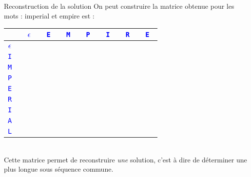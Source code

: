 \documentclass[10pt]{beamer}
\begin{document}
\begin{frame}{\Ctitle}{\stitle}
	\begin{exampleblock}{Reconstruction de la solution}
		{\small On peut construire la matrice obtenue pour les mots  : {\sc imperial} et {\sc empire} est : \\}
		\renewcommand{\arraystretch}{1.2}
		\quad \quad \begin{tabular}{|>{\tt}c|>{\tt}c|>{\tt}c|>{\tt}c|>{\tt}c|>{\tt}c|>{\tt}c|>{\tt}c|}

			\cline{2-8}
			\multicolumn{1}{c|}{}        & \textcolor{blue}{$\epsilon$} & \textcolor{blue}{E} & \textcolor{blue}{M} & \textcolor{blue}{P} & \textcolor{blue}{I} & \textcolor{blue}{R} & \textcolor{blue}{E} \\
			\hline
			\textcolor{blue}{$\epsilon$} &                              &                     &                     &                     &                     &                     &                     \\
			\textcolor{blue}{I}          &                              &                     &                     &                     &                     &                     &                     \\
			\textcolor{blue}{M}          &                              &                     &                     &                     &                     &                     &                     \\
			\textcolor{blue}{P}          &                              &                     &                     &                     &                     &                     &                     \\
			\textcolor{blue}{E}          &                              &                     &                     &                     &                     &                     &                     \\
			\textcolor{blue}{R}          &                              &                     &                     &                     &                     &                     &                     \\
			\textcolor{blue}{I}          &                              &                     &                     &                     &                     &                     &                     \\
			\textcolor{blue}{A}          &                              &                     &                     &                     &                     &                     &                     \\
			\textcolor{blue}{L}          &                              &                     &                     &                     &                     &                     &                     \\
			\hline
		\end{tabular}\\
		Cette matrice permet de reconstruire \textit{une} solution, c'est à dire de déterminer une plus longue sous séquence commune.
	\end{exampleblock}
\end{frame}
\end{document}
